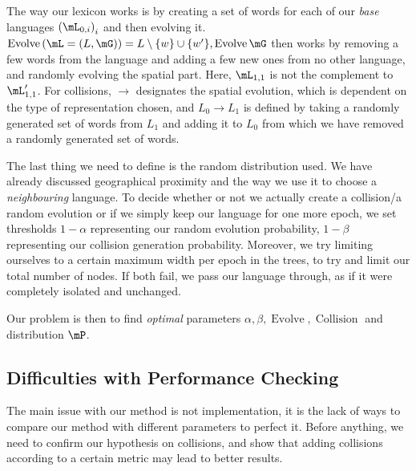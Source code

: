 \documentclass[math, info, english]{cours}
\DeclareMathOperator{\revo}{Evolve}
\DeclareMathOperator{\coll}{Collision}
\begin{document}
The way our lexicon works is by creating a set of words for each of our \emph{base} languages $\left(\mL_{0, i}\right)_{i}$ and then evolving it.
$\revo\left( \mL = \left(L, \mG\right) \right) = L \setminus \{w\} \cup \{w'\}, \revo\mG$ then works by removing a few words from the language and adding a few new ones from no other language, and randomly evolving the spatial part.
Here, $\mL_{1, 1}$ is not the complement to $\mL'_{1, 1}$.
For collisions, $\to$ designates the spatial evolution, which is dependent on the type of representation chosen, and $L_{0} \to L_{1}$ is defined by taking a randomly generated set of words from $L_{1}$ and adding it to $L_{0}$ from which we have removed a randomly generated set of words.


The last thing we need to define is the random distribution used.
We have already discussed geographical proximity and the way we use it to choose a \emph{neighbouring} language.
To decide whether or not we actually create a collision/a random evolution or if we simply keep our language for one more epoch, we set thresholds $1 - \alpha$ representing our random evolution probability, $1 - \beta$ representing our collision generation probability.
Moreover, we try limiting ourselves to a certain maximum width per epoch in the trees, to try and limit our total number of nodes.
If both fail, we pass our language through, as if it were completely isolated and unchanged.

Our problem is then to find \emph{optimal} parameters $\alpha, \beta, \revo, \coll$ and distribution $\mP$.

\subsection{Difficulties with Performance Checking}
The main issue with our method is not implementation, it is the lack of ways to compare our method with different parameters to perfect it.
Before anything, we need to confirm our hypothesis on collisions, and show that adding collisions according to a certain metric may lead to better results.
\end{document}
